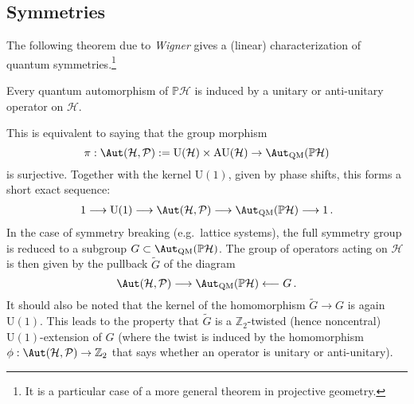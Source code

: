 \subsection{Symmetries}



    The following theorem due to \textit{Wigner} gives a (linear) characterization of quantum symmetries.\footnote{It is a particular case of a more general theorem in projective geometry.}
    \begin{theorem}[Wigner]
        Every quantum automorphism of $\mathbb{P}\mathcal{H}$ is induced by a unitary or anti-unitary operator on $\mathcal{H}$.
    \end{theorem}
    This is equivalent to saying that the group morphism \[\pi:\Aut(\mathcal{H},\mathcal{P}):=\mathrm{U}(\mathcal{H})\times\mathrm{AU}(\mathcal{H})\rightarrow\Aut_{\text{QM}}(\mathbb{P}\mathcal{H})\] is surjective. Together with the kernel $\mathrm{U}(1)$, given by phase shifts, this forms a short exact sequence:
    \begin{gather}
        1\longrightarrow\mathrm{U}(1)\longrightarrow\Aut(\mathcal{H},\mathcal{P})\longrightarrow\Aut_{\text{QM}}(\mathbb{P}\mathcal{H})\longrightarrow1\,.
    \end{gather}
    In the case of symmetry breaking (e.g.~lattice systems), the full symmetry group is reduced to a subgroup $G\subset\Aut_{\text{QM}}(\mathbb{P}\mathcal{H})$. The group of operators acting on $\mathcal{H}$ is then given by the pullback $\widetilde{G}$ of the diagram \[\Aut(\mathcal{H},\mathcal{P})\longrightarrow\Aut_{\text{QM}}(\mathbb{P}\mathcal{H})\longleftarrow G\,.\] It should also be noted that the kernel of the homomorphism $\widetilde{G}\rightarrow G$ is again $\mathrm{U}(1)$. This leads to the property that $\widetilde{G}$ is a $\mathbb{Z}_2$-twisted (hence noncentral) $\mathrm{U}(1)$-extension of $G$ (where the twist is induced by the homomorphism $\phi:\Aut(\mathcal{H},\mathcal{P})\rightarrow\mathbb{Z}_2$ that says whether an operator is unitary or anti-unitary).

